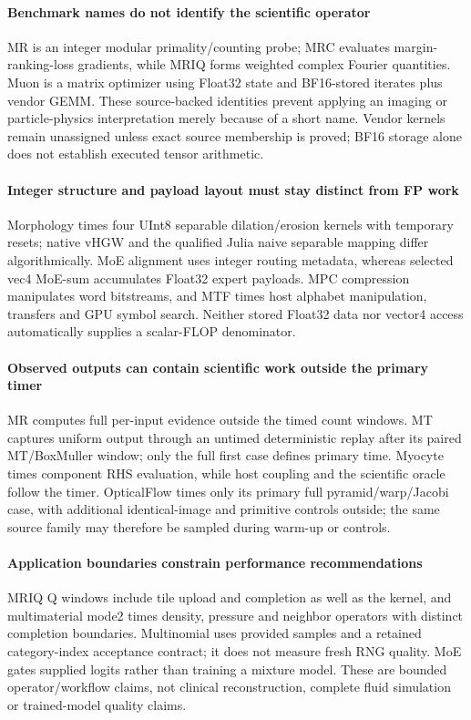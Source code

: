 \paragraph{Benchmark names do not identify the scientific operator} MR is an integer modular primality/counting probe; MRC evaluates margin-ranking-loss gradients, while MRIQ forms weighted complex Fourier quantities. Muon is a matrix optimizer using Float32 state and BF16-stored iterates plus vendor GEMM. These source-backed identities prevent applying an imaging or particle-physics interpretation merely because of a short name. Vendor kernels remain unassigned unless exact source membership is proved; BF16 storage alone does not establish executed tensor arithmetic.

\paragraph{Integer structure and payload layout must stay distinct from FP work} Morphology times four UInt8 separable dilation/erosion kernels with temporary resets; native vHGW and the qualified Julia naive separable mapping differ algorithmically. MoE alignment uses integer routing metadata, whereas selected vec4 MoE-sum accumulates Float32 expert payloads. MPC compression manipulates word bitstreams, and MTF times host alphabet manipulation, transfers and GPU symbol search. Neither stored Float32 data nor vector4 access automatically supplies a scalar-FLOP denominator.

\paragraph{Observed outputs can contain scientific work outside the primary timer} MR computes full per-input evidence outside the timed count windows. MT captures uniform output through an untimed deterministic replay after its paired MT/BoxMuller window; only the full first case defines primary time. Myocyte times component RHS evaluation, while host coupling and the scientific oracle follow the timer. OpticalFlow times only its primary full pyramid/warp/Jacobi case, with additional identical-image and primitive controls outside; the same source family may therefore be sampled during warm-up or controls.

\paragraph{Application boundaries constrain performance recommendations} MRIQ Q windows include tile upload and completion as well as the kernel, and multimaterial mode2 times density, pressure and neighbor operators with distinct completion boundaries. Multinomial uses provided samples and a retained category-index acceptance contract; it does not measure fresh RNG quality. MoE gates supplied logits rather than training a mixture model. These are bounded operator/workflow claims, not clinical reconstruction, complete fluid simulation or trained-model quality claims.
